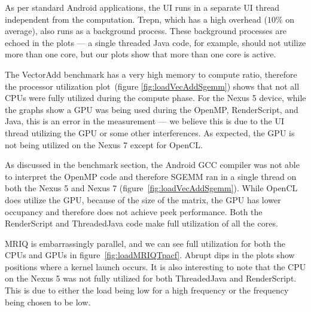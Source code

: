 As per standard Android applications, the UI runs in a separate UI thread 
  independent from the computation.
Trepn, which has a high overhead ($10\%$ on average), also runs as a background
  process.
These background processes are echoed in
  the plots --- a single threaded Java code, for example, should not utilize more than one core, but our plots show that more than one core is active.


The VectorAdd benchmark has a very high memory to compute ratio, therefore the processor utilization
  plot~(figure \ref{fig:loadVecAddSgemm}) shows that not all CPUs 
  were fully utilized during the compute phase.
For the Nexus 5 device, while the graphs show a GPU was being used during the OpenMP,
  RenderScript, and Java, this is an error in the measurement --- we believe this is 
  due to the UI thread utilizing the GPU or some other interferences.
As expected, the GPU is not being utilized on the Nexus 7 except for OpenCL.

As discussed in the benchmark section, the Android GCC compiler was not able 
  to interpret the OpenMP  code and therefore SGEMM ran in a single thread
  on both the Nexus 5 and Nexus 7 (figure~\ref{fig:loadVecAddSgemm}).
While OpenCL does utilize the GPU, because of the size of the matrix, the GPU has
  lower occupancy and therefore does not achieve peek performance.
Both the RenderScript and ThreadedJava code make full utilization of all the cores.

MRIQ is embarrassingly parallel, and we can see full utilization for both the CPUs and GPUs in figure~\ref{fig:loadMRIQTpacf}.
Abrupt dips in the plots show positions where a kernel launch occurs.
It is also interesting to note that the CPU on the Nexus 5 was not fully utilized for both ThreadedJava and RenderScript.
This is due to either the load being low for a high frequency or the frequency being 
  chosen to be low.

